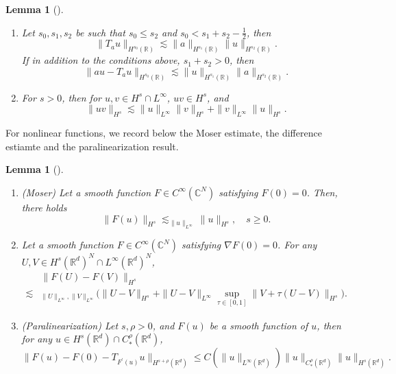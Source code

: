 \documentclass[12pt]{amsart}
\newtheorem{lemma}[theorem]{Lemma}
\theoremstyle{definition}
\numberwithin{equation}{section}
\newcommand{\R}{\mathbb{R}}
\begin{document}
\begin{lemma}[\hspace{1sp}\cite{MR2768550}]
\begin{enumerate}
\item Let $s_0, s_1, s_2$ be such that $s_0 \leq s_2$ and $s_0< s_1 +s_2 -\frac{1}{2}$, then
\begin{equation}
    \|T_a u\|_{H^{s_0}(\mathbb{R})} \lesssim \| a\|_{H^{s_1}(\mathbb{R})} \|u \|_{H^{s_2}(\mathbb{R})}.
\end{equation}
If in addition to the conditions above, $s_1 +s_2 >0$, then
\begin{equation} \label{BalancedError}
\|au -T_a u \|_{H^{s_0}(\mathbb{R})} \lesssim \| u\|_{H^{s_1}(\mathbb{R})} \|a \|_{H^{s_2}(\mathbb{R})}.
\end{equation}
\item For $s>0$, then for $u, v\in H^s\cap L^\infty$, $uv\in H^s$, and 
\begin{equation} \label{HsLinftyEst}
 \|uv\|_{H^s} \lesssim \|u\|_{L^\infty} \|v\|_{H^s} + \|v\|_{L^\infty} \|u\|_{H^s}.
\end{equation}
\end{enumerate}
\end{lemma}

For nonlinear functions, we record below the Moser estimate, the difference estiamte and the paralinearization result.
\begin{lemma}[\hspace{1sp}\cite{MR2768550}]
\begin{enumerate}
\item (Moser) Let  a smooth function $F\in C^\infty(\mathbb{C}^N)$ satisfying $F(0) = 0$.
Then, there holds
\begin{equation} \label{MoserOne}
\|F(u) \|_{H^s} \lesssim_{\|u\|_{L^\infty}} \|u\|_{H^s},\quad s\geq 0.  
\end{equation}
\item  Let a smooth function $F\in C^\infty(\mathbb{C}^N)$ satisfying $\nabla F(0) = 0$.
For any $U,V \in H^s(\R^d)^N \cap L^\infty(\R^d)^N$, 
\begin{equation} \label{FUVDiffEst}
\begin{aligned}
& \|F(U)-F(V)\|_{H^s} \\
 \lesssim&_{\|U\|_{L^\infty}, \|V\|_{L^\infty}} \Big(  \|U-V\|_{H^s} + \|U-V\|_{L^\infty} \sup_{\tau\in [0,1]} \|V+\tau(U-V) \|_{H^s}\Big).
 \end{aligned}
\end{equation}
\item (Paralinearization) Let $s, \rho>0$, and $F(u)$ be a smooth function of $u$, then for any $u\in H^s(\mathbb{R}^d)\cap C^\rho_{*}(\mathbb{R}^d)$,
\begin{equation} \label{Paralinearization}
    \|F(u)-F(0)-T_{F^{'}(u)}u\|_{H^{s+\rho}(\mathbb{R}^d)} \leq C(\|u\|_{L^\infty(\mathbb{R}^d)})\|u\|_{C^\rho_{*}(\mathbb{R}^d)}\|u\|_{H^s(\mathbb{R}^d)}.
\end{equation}
\end{enumerate}
\end{lemma}
\end{document}

